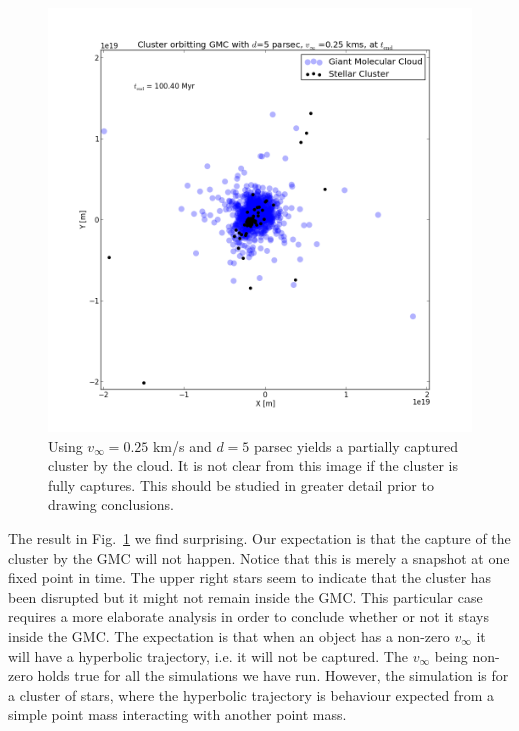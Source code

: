 \documentclass{aa}
\begin{document}
\begin{figure}[h!]
    \centering
    \includegraphics[width=\hsize]{img/v_25_d_5.png}
    \caption{Using $v_\infty = 0.25$ km/s and $d = 5$ parsec yields a partially captured cluster by the cloud. It is not clear from this image if the cluster is fully captures. This should be studied in greater detail prior to drawing conclusions.}\label{fig:v_25_d_5}
\end{figure}

The result in Fig.~\ref{fig:v_25_d_5} we find surprising. Our expectation is that the capture of the cluster by the GMC will not happen. Notice that this is merely a snapshot at one fixed point in time. The upper right stars seem to indicate that the cluster has been disrupted but it might not remain inside the GMC. This particular case requires a more elaborate analysis in order to conclude whether or not it stays inside the GMC. The expectation is that when an object has a non-zero $v_\infty$ it will have a hyperbolic trajectory, i.e. it will not be captured. The $v_\infty$ being non-zero holds true for all the simulations we have run. However, the simulation is for a cluster of stars, where the hyperbolic trajectory is behaviour expected from a simple point mass interacting with another point mass.
\end{document}
